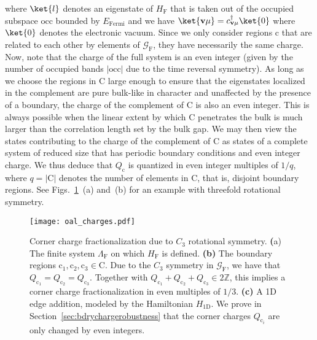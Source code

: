 where $\ket{l}$ denotes an eigenstate of $H_\mathrm{F}$ that is taken out of the occupied subspace $\mathrm{occ}$ bounded by $E_\mathrm{Fermi}$ and we have $\ket{\mathbf{v} \mu} = c^\dagger_{\mathbf{v} \mu} \ket{0}$ where $\ket{0}$ denotes the electronic vacuum. Since we only consider regions $\mathrm{c}$ that are related to each other by elements of $\mathcal{G}_\mathrm{F}$, they have necessarily the same charge. Now, note that the charge of the full system is an even integer (given by the number of occupied bands $|\mathrm{occ}|$ due to the time reversal symmetry). As long as we choose the regions in $\mathrm{C}$ large enough to ensure that the eigenstates localized in the complement are pure bulk-like in character and unaffected by the presence of a boundary, the charge of the complement of $\mathrm{C}$ is also an even integer. This is always possible when the linear extent by which $\mathrm{C}$ penetrates the bulk is much larger than the correlation length set by the bulk gap. We may then view the states contributing to the charge of the complement of $\mathrm{C}$ as states of a complete system of reduced size that has periodic boundary conditions and even integer charge. We thus deduce that $Q_\mathrm{c}$ is quantized in even integer multiples of $1/q$, where $q = |\mathrm{C}|$ denotes the number of elements in $\mathrm{C}$, that is, disjoint boundary regions. See Figs.~\ref{fig:cornerchargefrac}~(a) and~(b) for an example with threefold rotational symmetry.

\begin{figure}[H]
\centering
\texttt{[image: oal\_charges.pdf]}
\caption[Corner charge fractionalization due to $C_3$ rotational symmetry]{Corner charge fractionalization due to $C_3$ rotational symmetry. \textbf({a)} The finite system $\Lambda_\mathrm{F}$ on which $H_\mathrm{F}$ is defined. \textbf{(b)} The boundary regions $\mathrm{c}_1, \mathrm{c}_2, \mathrm{c}_3 \in \mathrm{C}$. Due to the $C_3$ symmetry in $\mathcal{G}_\mathrm{F}$, we have that $Q_{\mathrm{c}_1} = Q_{\mathrm{c}_2} = Q_{\mathrm{c}_3}$. Together with $Q_{\mathrm{c}_1} + Q_{\mathrm{c}_2} + Q_{\mathrm{c}_3} \in 2 \mathbb{Z}$, this implies a corner charge fractionalization in even multiples of $1/3$. \textbf{(c)} A 1D edge addition, modeled by the Hamiltonian $H_{\mathrm{1D}}$. We prove in Section~\ref{sec:bdrychargerobustness} that the corner charges $Q_{\mathrm{c}_i}$ are only changed by even integers.}
\label{fig:cornerchargefrac}
\end{figure}

